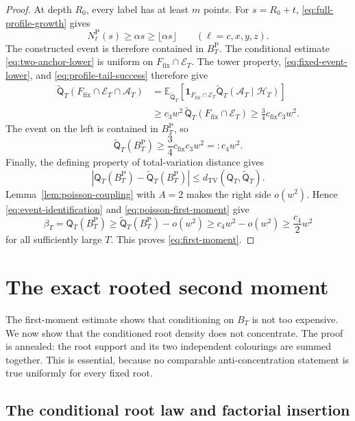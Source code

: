 \documentclass[11pt]{article}
\numberwithin{equation}{section}
\theoremstyle{plain}
\newcommand{\E}{\mathbb E}
\newcommand{\1}{\mathbf 1}
\newcommand{\TV}{\operatorname{TV}}
\begin{document}
\begin{proof}
At depth $R_0$, every label has at least $m$ points.  For
$s=R_0+t$, \eqref{eq:full-profile-growth} gives
\[
 N_\ell^{\mathrm P}(s)
 \ge\alpha s\ge\lfloor\alpha s\rfloor
 \qquad(\ell=c,x,y,z).
\]
The constructed event is therefore contained in $B_T^{\mathrm P}$.
The conditional estimate \eqref{eq:two-anchor-lower} is uniform on
$F_{\mathrm{fix}}\cap\mathcal E_T$.  The tower property,
\eqref{eq:fixed-event-lower}, and \eqref{eq:profile-tail-success} therefore
give
\begin{align*}
 \widetilde{\mathsf Q}_T(
 F_{\mathrm{fix}}\cap\mathcal E_T\cap\mathcal A_T)
 &=\E_{\widetilde{\mathsf Q}_T}\!\left[
   \1_{F_{\mathrm{fix}}\cap\mathcal E_T}
   \widetilde{\mathsf Q}_T(\mathcal A_T\mid\mathcal H_T)
   \right]\\
 &\ge c_3w^2\,
   \widetilde{\mathsf Q}_T(F_{\mathrm{fix}}\cap\mathcal E_T)
 \ge\frac34c_{\mathrm{fix}}c_3w^2.
\end{align*}
The event on the left is contained in $B_T^{\mathrm P}$, so
\begin{equation}\label{eq:poisson-first-moment}
 \widetilde{\mathsf Q}_T(B_T^{\mathrm P})
 \ge\frac34c_{\mathrm{fix}}c_3w^2=:c_4w^2.
\end{equation}
Finally, the defining property of total-variation distance gives
\[
 \left|
 \mathsf Q_T(B_T^{\mathrm P})
 -\widetilde{\mathsf Q}_T(B_T^{\mathrm P})
 \right|
 \le d_{\TV}(\mathsf Q_T,\widetilde{\mathsf Q}_T).
\]
Lemma~\ref{lem:poisson-coupling} with $A=2$ makes the right side
$o(w^2)$.  Hence \eqref{eq:event-identification} and
\eqref{eq:poisson-first-moment} give
\[
 \beta_T
 =\mathsf Q_T(B_T^{\mathrm P})
 \ge\widetilde{\mathsf Q}_T(B_T^{\mathrm P})-o(w^2)
 \ge c_4w^2-o(w^2)
 \ge\frac{c_4}{2}w^2
\]
for all sufficiently large $T$.  This proves
\eqref{eq:first-moment}.
\end{proof}

\section{The exact rooted second moment}\label{sec:secondmoment}

The first-moment estimate shows that conditioning on $B_T$ is not too
expensive.  We now show that the conditioned root density does not
concentrate.  The proof is annealed: the root support and its two independent
colourings are summed together.  This is essential, because no comparable
anti-concentration statement is true uniformly for every fixed root.

\subsection{The conditional root law and factorial insertion}
\end{document}
